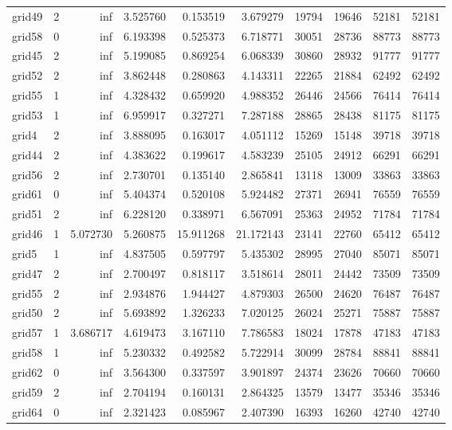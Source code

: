\begin{longtable}{|l|r|r|r|r|r|r|r|r|r|}
grid49 & 2 & inf & 3.525760 & 0.153519 & 3.679279 & 19794 & 19646 & 52181 & 52181 \\
grid58 & 0 & inf & 6.193398 & 0.525373 & 6.718771 & 30051 & 28736 & 88773 & 88773 \\
grid45 & 2 & inf & 5.199085 & 0.869254 & 6.068339 & 30860 & 28932 & 91777 & 91777 \\
grid52 & 2 & inf & 3.862448 & 0.280863 & 4.143311 & 22265 & 21884 & 62492 & 62492 \\
grid55 & 1 & inf & 4.328432 & 0.659920 & 4.988352 & 26446 & 24566 & 76414 & 76414 \\
grid53 & 1 & inf & 6.959917 & 0.327271 & 7.287188 & 28865 & 28438 & 81175 & 81175 \\
grid4 & 2 & inf & 3.888095 & 0.163017 & 4.051112 & 15269 & 15148 & 39718 & 39718 \\
grid44 & 2 & inf & 4.383622 & 0.199617 & 4.583239 & 25105 & 24912 & 66291 & 66291 \\
grid56 & 2 & inf & 2.730701 & 0.135140 & 2.865841 & 13118 & 13009 & 33863 & 33863 \\
grid61 & 0 & inf & 5.404374 & 0.520108 & 5.924482 & 27371 & 26941 & 76559 & 76559 \\
grid51 & 2 & inf & 6.228120 & 0.338971 & 6.567091 & 25363 & 24952 & 71784 & 71784 \\
grid46 & 1 & 5.072730 & 5.260875 & 15.911268 & 21.172143 & 23141 & 22760 & 65412 & 65412 \\
grid5 & 1 & inf & 4.837505 & 0.597797 & 5.435302 & 28995 & 27040 & 85071 & 85071 \\
grid47 & 2 & inf & 2.700497 & 0.818117 & 3.518614 & 28011 & 24442 & 73509 & 73509 \\
grid55 & 2 & inf & 2.934876 & 1.944427 & 4.879303 & 26500 & 24620 & 76487 & 76487 \\
grid50 & 2 & inf & 5.693892 & 1.326233 & 7.020125 & 26024 & 25271 & 75887 & 75887 \\
grid57 & 1 & 3.686717 & 4.619473 & 3.167110 & 7.786583 & 18024 & 17878 & 47183 & 47183 \\
grid58 & 1 & inf & 5.230332 & 0.492582 & 5.722914 & 30099 & 28784 & 88841 & 88841 \\
grid62 & 0 & inf & 3.564300 & 0.337597 & 3.901897 & 24374 & 23626 & 70660 & 70660 \\
grid59 & 2 & inf & 2.704194 & 0.160131 & 2.864325 & 13579 & 13477 & 35346 & 35346 \\
grid64 & 0 & inf & 2.321423 & 0.085967 & 2.407390 & 16393 & 16260 & 42740 & 42740 \\

\end{longtable}
